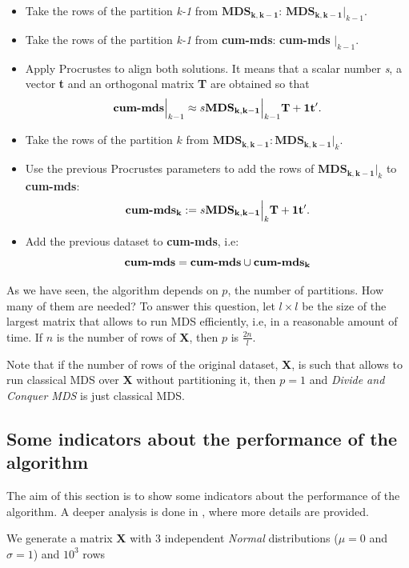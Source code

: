 \documentclass[11pt]{report}
\begin{document}
\begin{itemize}
\begin{itemize}
\item Take the rows of the partition \textit{k-1} from $\mathbf{MDS_{k, k-1}}$: 
$\mathbf{MDS_{k, k-1}} \Bigr|_{k-1}$.
\item Take the rows of the partition \textit{k-1} from \textbf{cum-mds}: 
\textbf{cum-mds} $\Bigr|_{k-1}$.
\item Apply Procrustes to align both solutions. It means that a scalar number
\textit{s}, a vector \textbf{t} and an orthogonal matrix \textbf{T} are obtained
so that
\[
\textbf{\mbox{cum-mds}} \Bigr|_{k-1} \approx s \mathbf{MDS_{k, k-1}} \Bigr|_{k-1} \mathbf{T} + \mathbf{1t'}.
\]
\item Take the rows of the partition $k$ from $\mathbf{MDS_{k, k-1}}: \mathbf{MDS_{k, k-1}} \Bigr|_{k}$.
\item Use the previous Procrustes parameters to add the rows of 
$\mathbf{MDS_{k, k-1}} \Bigr|_{k}$ to \textbf{cum-mds}:
\[
\textbf{\mbox{cum-mds}}_\textbf{k} := s \mathbf{MDS_{k, k-1}} \Bigr|_{k} \mathbf{T} + \mathbf{1t}'.
\]
\item Add the previous dataset to \textbf{cum-mds}, i.e:
\[
\textbf{\mbox{cum-mds}} = \textbf{\mbox{cum-mds}} \cup \textbf{\mbox{cum-mds}}_\textbf{k}
\]

\end{itemize}
\end{itemize}

As we have seen, the algorithm depends on $p$, the number of partitions. How 
many of them are needed? To answer this question, let $l \times l$ be the 
size of the largest matrix that allows to run MDS efficiently, i.e, in a 
reasonable amount of time. If $n$ is the number of rows 
of \textbf{X}, then $p$ is $\frac{2n}{l}$. 

\indent Note that if the number of rows of the original dataset, \textbf{X}, 
is such that allows to run classical MDS over \textbf{X} without partitioning 
it, then $p=1$ and \textit{Divide and Conquer MDS} is just classical MDS.


\subsection{Some indicators about the performance of the algorithm}
\label{chap:ind_div}
The aim of this section is to show some indicators about the performance of the
algorithm. A deeper analysis is done in , where more details are
provided.

\indent We generate a matrix \textbf{X} with 3 independent \textit{Normal} 
distributions ($\mu = 0$ and $\sigma = 1$) and $10^3$ rows 
\end{document}
